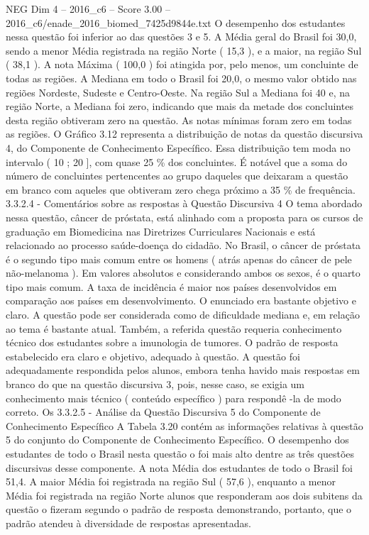 \begin{textsample}{NEG Dim 4 – 2016\_c6 – Score 3.00 – 2016\_c6/enade\_2016\_biomed\_7425d9844e.txt}
O desempenho dos estudantes nessa questão foi inferior ao das questões 3 e 5.
A Média geral do Brasil foi 30,0, sendo a menor Média registrada na região Norte ( 15,3 ), e a maior, na região Sul ( 38,1 ).
A nota Máxima ( 100,0 ) foi atingida por, pelo menos, um concluinte de todas as regiões.
A Mediana em todo o Brasil foi 20,0, o mesmo valor obtido nas regiões Nordeste, Sudeste e Centro-Oeste.
Na região Sul a Mediana foi 40 e, na região Norte, a Mediana foi zero, indicando que mais da metade dos concluintes desta região obtiveram zero na questão.
As notas mínimas foram zero em todas as regiões.
O Gráfico 3.12 representa a distribuição de notas da questão discursiva 4, do Componente de Conhecimento Específico.
Essa distribuição tem moda no intervalo ( 10 ; 20 ], com quase 25 \% dos concluintes.
É notável que a soma do número de concluintes pertencentes ao grupo daqueles que deixaram a questão em branco com aqueles que obtiveram zero chega próximo a 35 \% de frequência. 3.3.2.4 - Comentários sobre as respostas à Questão Discursiva 4 O tema abordado nessa questão, câncer de próstata, está alinhado com a proposta para os cursos de graduação em Biomedicina nas Diretrizes Curriculares Nacionais e está relacionado ao processo saúde-doença do cidadão.
No Brasil, o câncer de próstata é o segundo tipo mais comum entre os homens ( atrás apenas do câncer de pele não-melanoma ).
Em valores absolutos e considerando ambos os sexos, é o quarto tipo mais comum.
A taxa de incidência é maior nos países desenvolvidos em comparação aos países em desenvolvimento.
O enunciado era bastante objetivo e claro.
A questão pode ser considerada como de dificuldade mediana e, em relação ao tema é bastante atual.
Também, a referida questão requeria conhecimento técnico dos estudantes sobre a imunologia de tumores.
O padrão de resposta estabelecido era claro e objetivo, adequado à questão.
A questão foi adequadamente respondida pelos alunos, embora tenha havido mais respostas em branco do que na questão discursiva 3, pois, nesse caso, se exigia um conhecimento mais técnico ( conteúdo específico ) para respondê -la de modo correto.
Os 3.3.2.5 - Análise da Questão Discursiva 5 do Componente de Conhecimento Específico A Tabela 3.20 contém as informações relativas à questão 5 do conjunto do Componente de Conhecimento Específico.
O desempenho dos estudantes de todo o Brasil nesta questão o foi mais alto dentre as três questões discursivas desse componente.
A nota Média dos estudantes de todo o Brasil foi 51,4.
A maior Média foi registrada na região Sul ( 57,6 ), enquanto a menor Média foi registrada na região Norte alunos que responderam aos dois subitens da questão o fizeram segundo o padrão de resposta demonstrando, portanto, que o padrão atendeu à diversidade de respostas apresentadas.

\end{textsample}
